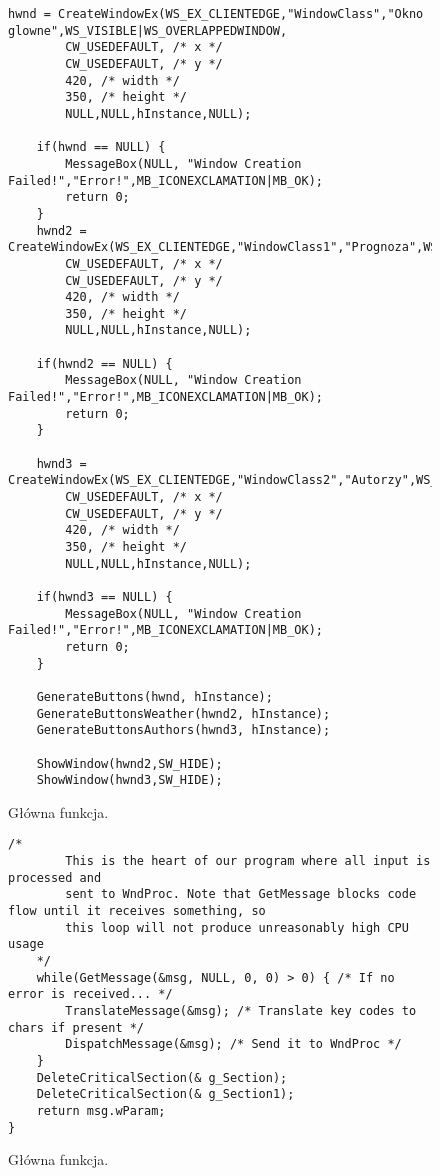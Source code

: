 \documentclass[a4paper,twoside,12pt]{mgr}
\begin{document}
\begin{figure}[H]
\centering
\begin{lstlisting}[frame=single]	
hwnd = CreateWindowEx(WS_EX_CLIENTEDGE,"WindowClass","Okno glowne",WS_VISIBLE|WS_OVERLAPPEDWINDOW,
		CW_USEDEFAULT, /* x */
		CW_USEDEFAULT, /* y */
		420, /* width */
		350, /* height */
		NULL,NULL,hInstance,NULL);

	if(hwnd == NULL) {
		MessageBox(NULL, "Window Creation Failed!","Error!",MB_ICONEXCLAMATION|MB_OK);
		return 0;
	}
	hwnd2 = CreateWindowEx(WS_EX_CLIENTEDGE,"WindowClass1","Prognoza",WS_VISIBLE|WS_OVERLAPPEDWINDOW,
		CW_USEDEFAULT, /* x */
		CW_USEDEFAULT, /* y */
		420, /* width */
		350, /* height */
		NULL,NULL,hInstance,NULL);

	if(hwnd2 == NULL) {
		MessageBox(NULL, "Window Creation Failed!","Error!",MB_ICONEXCLAMATION|MB_OK);
		return 0;
	}
	
	hwnd3 = CreateWindowEx(WS_EX_CLIENTEDGE,"WindowClass2","Autorzy",WS_VISIBLE|WS_OVERLAPPEDWINDOW,
		CW_USEDEFAULT, /* x */
		CW_USEDEFAULT, /* y */
		420, /* width */
		350, /* height */
		NULL,NULL,hInstance,NULL);

	if(hwnd3 == NULL) {
		MessageBox(NULL, "Window Creation Failed!","Error!",MB_ICONEXCLAMATION|MB_OK);
		return 0;
	}

	GenerateButtons(hwnd, hInstance);
	GenerateButtonsWeather(hwnd2, hInstance);
	GenerateButtonsAuthors(hwnd3, hInstance);
	
	ShowWindow(hwnd2,SW_HIDE);
	ShowWindow(hwnd3,SW_HIDE);
\end{lstlisting}
\caption{Główna funkcja.}%
\label{rys:etykieta}
\end{figure}	

\begin{figure}[H]
\centering
\begin{lstlisting}[frame=single]	
	/*
		This is the heart of our program where all input is processed and 
		sent to WndProc. Note that GetMessage blocks code flow until it receives something, so
		this loop will not produce unreasonably high CPU usage
	*/
	while(GetMessage(&msg, NULL, 0, 0) > 0) { /* If no error is received... */
		TranslateMessage(&msg); /* Translate key codes to chars if present */
		DispatchMessage(&msg); /* Send it to WndProc */
	}
	DeleteCriticalSection(& g_Section);
	DeleteCriticalSection(& g_Section1);
	return msg.wParam;
}
\end{lstlisting}
\caption{Główna funkcja.}%
\label{rys:etykieta}
\end{figure}		
\end{document}
